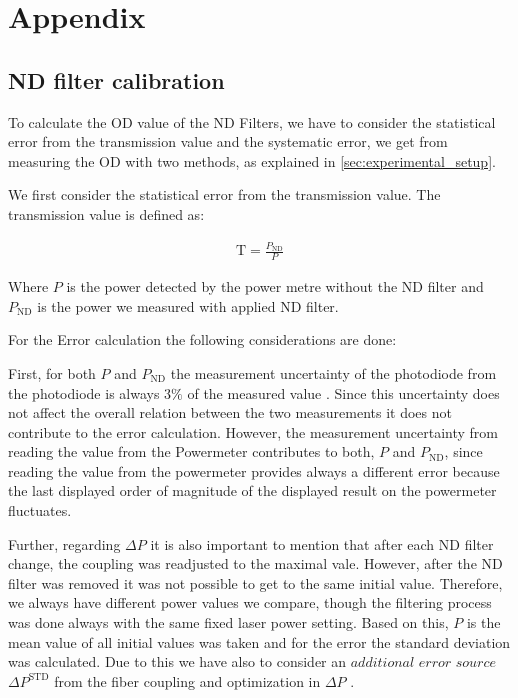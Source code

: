 \chapter{Appendix}
\label{sec:app}

\section{ND filter calibration}\label{sec:ND_filter_calibration_appendix}

To calculate the OD value of the ND Filters, we have to consider the statistical error from the
transmission value and the systematic error, we get from measuring the OD with two methods, as explained in \ref{sec:experimental_setup}.

We first consider the statistical error from the transmission value.
The transmission value is defined as:

\begin{align}
    \text{T}=\frac{P_{\text{ND}}}{P}
\end{align}

Where $P$ is the power detected by the power metre without the ND filter and $P_{\text{ND}}$
is the power we measured with applied ND filter.

For the Error calculation the following considerations are done: 

First, for both $P$ and $P_{\text{ND}}$ the measurement uncertainty of the photodiode from the photodiode is always 3$\%$
of the measured value \cite{Thorlabs-power-metre}.
Since this uncertainty does not affect the overall relation between the two measurements it does not
contribute to the error calculation.
However, the measurement uncertainty from reading the value from the Powermeter contributes to both,
$P$ and $P_{\text{ND}}$, since reading the value from the powermeter provides always a different error because
the last displayed order of magnitude of the displayed result on the powermeter fluctuates.

Further, regarding  $\Delta P$ it is also important to mention that after each ND filter change,
the coupling was readjusted to the maximal vale.
However, after the ND filter was removed it was not possible to get to the same initial value.
Therefore, we always have different power values we compare, though the filtering process was done always with the same
fixed laser power setting.
Based on this, $P$ is the mean value of all initial values was taken and for the error the standard
deviation was calculated.
Due to this we have also to consider an $\textit{additional error source} $ $\Delta P^{\text{STD}}$ from the fiber
coupling and optimization in $\Delta P$ .

